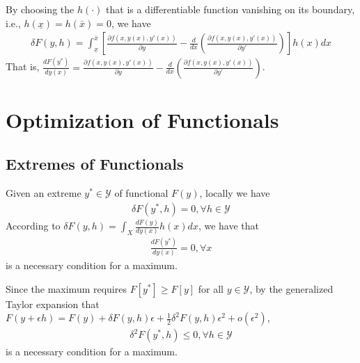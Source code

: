 \documentclass[11pt]{elegantbook}
\begin{document}
\begin{note}
    By choosing the $h(\cdot)$ that is a differentiable function vanishing on its boundary, i.e., $h(\underline{x})=h(\bar{x})=0$, we have
    \begin{equation}
        \begin{aligned}
            \delta F(y,h)= \int_{\underline{x}}^{\bar{x}} \left[\frac{\partial f(x,y(x),y'(x))}{\partial y}-\frac{d}{dx}\left(\frac{\partial f(x,y(x),y'(x))}{\partial y'}\right)\right] h(x) dx
        \end{aligned}
        \label{GD_van}
        \tag{GD}
    \end{equation}
    That is, $\frac{d F(y^*)}{d y(x)}=\frac{\partial f(x,y(x),y'(x))}{\partial y}-\frac{d}{dx}\left(\frac{\partial f(x,y(x),y'(x))}{\partial y'}\right)$.
\end{note}


\section{Optimization of Functionals}
\subsection{Extremes of Functionals}
Given an extreme $y^*\in \mathcal{Y}$ of functional $F(y)$, locally we have
\begin{equation}
    \begin{aligned}
        \delta F(y^*,h)=0,\forall h\in \mathcal{Y}
    \end{aligned}
    \nonumber
\end{equation}
According to $\delta F(y,h)=\int_X\frac{d F(y)}{d y(x)}h(x) dx$, we have that
\begin{equation}
    \begin{aligned}
        \frac{d F(y^*)}{d y(x)}=0,\forall x
    \end{aligned}
    \label{N1}
    \tag{N1}
\end{equation}
is a necessary condition for a maximum.

Since the maximum requires $F[y^*]\geq F[y]$ for all $y\in \mathcal{Y}$, by the generalized Taylor expansion that $F(y+\epsilon h)=F(y)+ \delta F(y,h) \epsilon +\frac{1}{2}\delta^2 F(y,h) \epsilon^2 + o(\epsilon^2)$,
\begin{equation}
    \begin{aligned}
        \delta^2 F(y^*,h)\leq 0,\forall h\in \mathcal{Y}
    \end{aligned}
    \label{N2}
    \tag{N2}
\end{equation}
is a necessary condition for a maximum.
\end{document}
